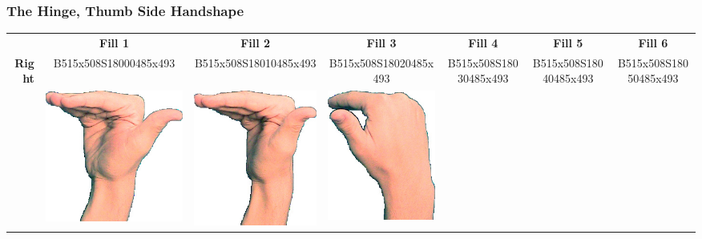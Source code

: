 \documentclass{article}
\begin{document}
\subsubsection{The Hinge, Thumb Side Handshape}

\begin{center}
\begin{tabular}{r*{6}{c}}
&\textbf{Fill 1}&\textbf{Fill 2}&\textbf{Fill 3}&\textbf{Fill 4}&\textbf{Fill 5}&\textbf{Fill 6}\\
\multirow{2}{*}{\textbf{Right}}&
B515x508S18000485x493&
B515x508S18010485x493&
B515x508S18020485x493&
B515x508S18030485x493&
B515x508S18040485x493&
B515x508S18050485x493\\
&
\includegraphics[scale=0.1]{images/05-19-1.jpg}&
\includegraphics[scale=0.1]{images/05-19-2.jpg}&
\includegraphics[scale=0.1]{images/05-19-3.jpg}&

\end{tabular}
\end{center}
\end{document}

